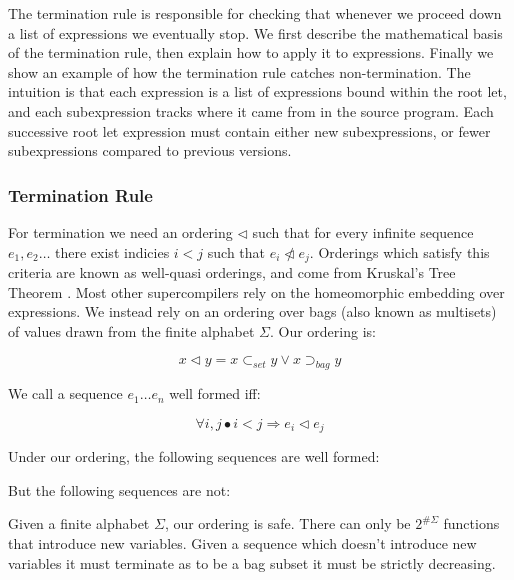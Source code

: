 \documentclass[draft]{sigplanconf}
\begin{document}
The termination rule is responsible for checking that whenever we proceed down a list of expressions we eventually stop. We first describe the mathematical basis of the termination rule, then explain how to apply it to expressions. Finally we show an example of how the termination rule catches non-termination. The intuition is that each expression is a list of expressions bound within the root let, and each subexpression tracks where it came from in the source program. Each successive root let expression must contain either new subexpressions, or fewer subexpressions compared to previous versions.

\subsubsection{Termination Rule}

For termination we need an ordering $\lhd$ such that for every infinite sequence $e_1,e_2 \ldots$ there exist indicies $i < j$ such that $e_i \ntriangleleft e_j$. Orderings which satisfy this criteria are known as well-quasi orderings, and come from Kruskal's Tree Theorem \cite{kruskal:tree}. Most other supercompilers rely on the homeomorphic embedding \cite{leuschel:homeomorphic} over expressions. We instead rely on an ordering over bags (also known as multisets) of values drawn from the finite alphabet $\Sigma$. Our ordering is:

\[
x \lhd y = x \subset_{set} y \vee x \supset_{bag} y
\]

We call a sequence $e_1 \ldots e_n$ well formed iff:

\[
\forall i,j \bullet i < j \Rightarrow e_i \lhd e_j
\]

Under our ordering, the following sequences are well formed:

\begin{code}
\end{code}

But the following sequences are not:

\begin{code}
\end{code}

Given a finite alphabet $\Sigma$, our ordering is safe. There can only be $2^{\#\Sigma}$ functions that introduce new variables. Given a sequence which doesn't introduce new variables it must terminate as to be a bag subset it must be strictly decreasing.
\end{document}
